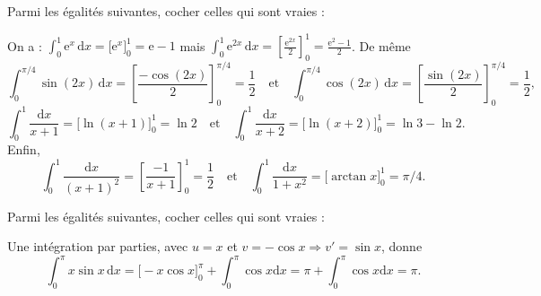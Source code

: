 \begin{question}
Parmi les égalités suivantes, cocher celles qui sont vraies : 
\begin{answers}  
\end{answers}
\vskip2mm
\begin{explanations}
On a : $\displaystyle \int _0^1\mathrm{e}^{x}\,\mathrm{d}x=\Big[\mathrm{e}^x\Big]_0^1=\mathrm{e}-1$ mais $\displaystyle \int _0^1\mathrm{e}^{2x}\,\mathrm{d}x=\left[\frac{\mathrm{e}^{2x}}{2}\right]_0^1=\frac{\mathrm{e}^2-1}{2}$. De même
$$\int _0^{\pi/4}\sin (2x)\,\mathrm{d}x=\left[\frac{-\cos (2x)}{2}\right]_0^{\pi/4}=\frac{1}{2}\quad \mbox{et}\quad \int _0^{\pi/4}\cos (2x)\,\mathrm{d}x=\left[\frac{\sin (2x)}{2}\right]_0^{\pi/4}=\frac{1}{2},$$
$$\int _0^{1}\frac{\mathrm{d}x}{x+1}=\Big[\ln (x+1)\Big]_0^1=\ln 2\quad \mbox{et}\quad \int _0^{1}\frac{\mathrm{d}x}{x+2}=\Big[\ln (x+2)\Big]_0^1=\ln 3-\ln 2.$$
Enfin,
$$\int _0^{1}\frac{\mathrm{d}x}{(x+1)^2}=\left[\frac{-1}{x+1}\right]_0^1=\frac{1}{2}\quad \mbox{et}\quad \int _0^{1}\frac{\mathrm{d}x}{1+x^2}=\Big[\arctan x\Big]_0^1=\pi/4.$$
\end{explanations}
\end{question}


\begin{question}
Parmi les égalités suivantes, cocher celles qui sont vraies :
\begin{answers}
\end{answers}
\vskip2mm
\begin{explanations}
Une intégration par parties, avec $u=x$ et $v=-\cos x\Rightarrow v'=\sin x$, donne
$$\int _0^{\pi}x\sin x\,\mathrm{d}x=\Big[-x\cos x\Big]_0^{\pi}+\int _0^{\pi}\cos x\mathrm{d}x=\pi +\int _0^{\pi}\cos x\mathrm{d}x=\pi.$$
\end{explanations}
\end{question}

